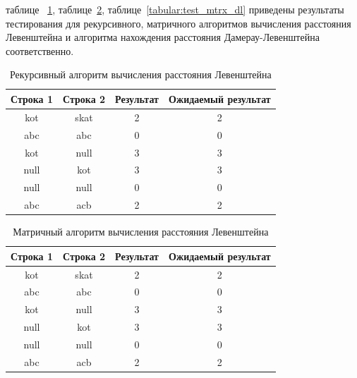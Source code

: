 \documentclass[a4paper,12pt]{article}
\begin{document}
		 таблице ~\ref{tabular:test_rec}, таблице~\ref{tabular:test_mtrx_l}, таблице~\ref{tabular:test_mtrx_dl} приведены результаты тестирования для рекурсивного, матричного алгоритмов вычисления расстояния Левенштейна и алгоритма нахождения расстояния Дамерау-Левенштейна соответственно.
        			\begin{table}[H]        		
       				\caption{\label{tabular:test_rec} Рекурсивный алгоритм вычисления расстояния Левенштейна}
       				\begin{center}       			
        			\begin{tabular}{|c|c|c|c|}        				
        				\hline
						Строка 1 & Строка 2 & Результат & Ожидаемый результат \\ 
						\hline
        				kot    & skat  & 2  & 2\\
        				abc  & abc &0  & 0\\
        				kot  & null  & 3  & 3\\
        				null  & kot  & 3  & 3\\
        				null  & null  & 0  & 0\\
        				abc  & acb  & 2 & 2\\
        				\hline
        			\end{tabular}
       				\end{center}
        			\end{table}        			
        			\vspace{1.5cm}
        		
        			\begin{table}[H]        		
       				\caption{\label{tabular:test_mtrx_l} Матричный алгоритм вычисления расстояния Левенштейна}
       				\begin{center}
        			\begin{tabular}{|c|c|c|c|}        		
						\hline
        				Строка 1 & Строка 2 &Результат &Ожидаемый результат \\ 							\hline
        				kot    &skat  &2  &2\\
        				abc  &abc &0  &0\\
        				kot  &null  &3  &3\\
        				null  &kot  &3  &3\\
        				null  &null  &0  &0\\
        				abc  &acb  &2 &2\\ 
        				\hline        				
        			\end{tabular}
        			\end{center}
        			\end{table}
        			\vspace{1.5cm}
        		
\end{document}
